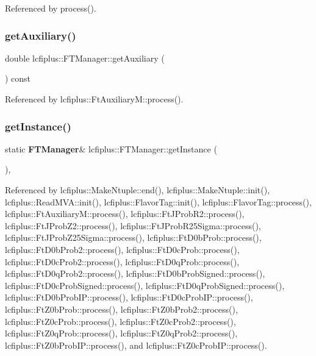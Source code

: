 Referenced by process().

\mbox{\label{classlcfiplus_1_1FTManager_a0656a449b3528ce1028f6a6713c8582d}} 
\subsubsection{get\+Auxiliary()}
{\footnotesize\ttfamily double lcfiplus\+::\+F\+T\+Manager\+::get\+Auxiliary (\begin{DoxyParamCaption}{ }\end{DoxyParamCaption}) const\hspace{0.3cm}{\ttfamily [inline]}}



Referenced by lcfiplus\+::\+Ft\+Auxiliary\+M\+::process().

\mbox{\label{classlcfiplus_1_1FTManager_adb1794dc4342b9fca995e77a9dbb580f}} 
\subsubsection{get\+Instance()}
{\footnotesize\ttfamily static \textbf{ F\+T\+Manager}\& lcfiplus\+::\+F\+T\+Manager\+::get\+Instance (\begin{DoxyParamCaption}{ }\end{DoxyParamCaption})\hspace{0.3cm}{\ttfamily [inline]}, {\ttfamily [static]}}



Referenced by lcfiplus\+::\+Make\+Ntuple\+::end(), lcfiplus\+::\+Make\+Ntuple\+::init(), lcfiplus\+::\+Read\+M\+V\+A\+::init(), lcfiplus\+::\+Flavor\+Tag\+::init(), lcfiplus\+::\+Flavor\+Tag\+::process(), lcfiplus\+::\+Ft\+Auxiliary\+M\+::process(), lcfiplus\+::\+Ft\+J\+Prob\+R2\+::process(), lcfiplus\+::\+Ft\+J\+Prob\+Z2\+::process(), lcfiplus\+::\+Ft\+J\+Prob\+R25\+Sigma\+::process(), lcfiplus\+::\+Ft\+J\+Prob\+Z25\+Sigma\+::process(), lcfiplus\+::\+Ft\+D0b\+Prob\+::process(), lcfiplus\+::\+Ft\+D0b\+Prob2\+::process(), lcfiplus\+::\+Ft\+D0c\+Prob\+::process(), lcfiplus\+::\+Ft\+D0c\+Prob2\+::process(), lcfiplus\+::\+Ft\+D0q\+Prob\+::process(), lcfiplus\+::\+Ft\+D0q\+Prob2\+::process(), lcfiplus\+::\+Ft\+D0b\+Prob\+Signed\+::process(), lcfiplus\+::\+Ft\+D0c\+Prob\+Signed\+::process(), lcfiplus\+::\+Ft\+D0q\+Prob\+Signed\+::process(), lcfiplus\+::\+Ft\+D0b\+Prob\+I\+P\+::process(), lcfiplus\+::\+Ft\+D0c\+Prob\+I\+P\+::process(), lcfiplus\+::\+Ft\+Z0b\+Prob\+::process(), lcfiplus\+::\+Ft\+Z0b\+Prob2\+::process(), lcfiplus\+::\+Ft\+Z0c\+Prob\+::process(), lcfiplus\+::\+Ft\+Z0c\+Prob2\+::process(), lcfiplus\+::\+Ft\+Z0q\+Prob\+::process(), lcfiplus\+::\+Ft\+Z0q\+Prob2\+::process(), lcfiplus\+::\+Ft\+Z0b\+Prob\+I\+P\+::process(), and lcfiplus\+::\+Ft\+Z0c\+Prob\+I\+P\+::process().

